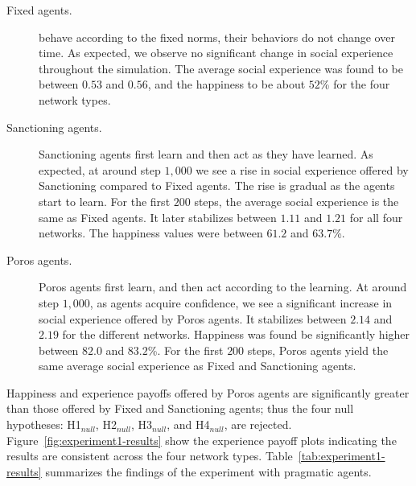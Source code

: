 \documentclass[11pt,          %
               phd,           %
               onehalfspacing %
               ]{ncsuthesis}
\newcommand{\frameworkB}{Poros\xspace}
\begin{document}
\begin{description} \item[Fixed agents.] behave
according to the fixed norms, their behaviors do not change over time.
As expected, we observe no significant change in social experience
throughout the simulation. The average social experience was found to be
between $0.53$ and $0.56$, and the happiness to be about $52$\% for the
four network types.

\item[Sanctioning agents.] Sanctioning agents first learn and then act as they
have learned. As expected, at around step $1,000$ we see a rise in
social experience offered by Sanctioning compared to Fixed agents. The rise
is gradual as the agents start to learn. For the first $200$ steps, the
average social experience is the same as Fixed agents. It later
stabilizes between $1.11$ and $1.21$ for all four networks. The happiness
values were between $61.2$ and $63.7$\%.

\item[\frameworkB agents.] \frameworkB agents first learn, and then act according
to the learning. At around step $1,000$, as agents acquire confidence,
we see a significant increase in social experience offered by \frameworkB
agents. It stabilizes between $2.14$ and $2.19$ for the different networks.
Happiness was found be significantly higher between $82.0$ and $83.2$\%.
For the first $200$ steps, \frameworkB agents yield the same average social
experience as Fixed and Sanctioning agents. \end{description}

Happiness and experience payoffs offered by \frameworkB agents are 
significantly greater than those offered by Fixed and Sanctioning agents;
thus the four null hypotheses: H1$_{null}$, H2$_{null}$, H3$_{null}$,
and H4$_{null}$, are rejected. Figure~\ref{fig:experiment1-results} show
the experience payoff plots indicating the results are consistent across
the four network types. Table~\ref{tab:experiment1-results} summarizes
the findings of the experiment with pragmatic agents.
\end{document}
